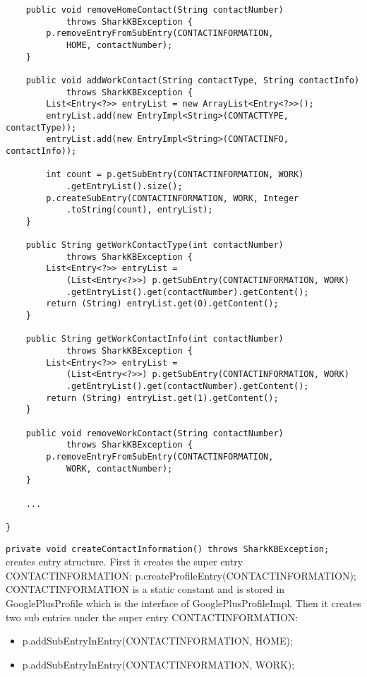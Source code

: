 \documentclass[12pt]{article}
\begin{document}
\begin{verbatim}
    public void removeHomeContact(String contactNumber) 
            throws SharkKBException {
        p.removeEntryFromSubEntry(CONTACTINFORMATION, 
            HOME, contactNumber);
    }

    public void addWorkContact(String contactType, String contactInfo) 
            throws SharkKBException {
        List<Entry<?>> entryList = new ArrayList<Entry<?>>();
        entryList.add(new EntryImpl<String>(CONTACTTYPE, contactType));
        entryList.add(new EntryImpl<String>(CONTACTINFO, contactInfo));

        int count = p.getSubEntry(CONTACTINFORMATION, WORK)
            .getEntryList().size();
        p.createSubEntry(CONTACTINFORMATION, WORK, Integer
            .toString(count), entryList);
    }

    public String getWorkContactType(int contactNumber) 
            throws SharkKBException {
        List<Entry<?>> entryList = 
            (List<Entry<?>>) p.getSubEntry(CONTACTINFORMATION, WORK)
            .getEntryList().get(contactNumber).getContent();
        return (String) entryList.get(0).getContent();
    }

    public String getWorkContactInfo(int contactNumber)    
            throws SharkKBException {
        List<Entry<?>> entryList = 
            (List<Entry<?>>) p.getSubEntry(CONTACTINFORMATION, WORK)
            .getEntryList().get(contactNumber).getContent();
        return (String) entryList.get(1).getContent();
    }

    public void removeWorkContact(String contactNumber) 
            throws SharkKBException {
        p.removeEntryFromSubEntry(CONTACTINFORMATION,
            WORK, contactNumber);
    }

    ...

}

\end{verbatim}

{\tt private void createContactInformation() throws SharkKBException;} creates entry structure. First it creates the super entry CONTACTINFORMATION: p.createProfileEntry(CONTACTINFORMATION); CONTACTINFORMATION is a static constant and is stored in GooglePlusProfile which is the interface of GooglePlusProfileImpl. Then it creates two sub entries under the super entry CONTACTINFORMATION: 

\begin{itemize}
  \item p.addSubEntryInEntry(CONTACTINFORMATION, HOME);
  \item p.addSubEntryInEntry(CONTACTINFORMATION, WORK);
\end{itemize}
\end{document}
